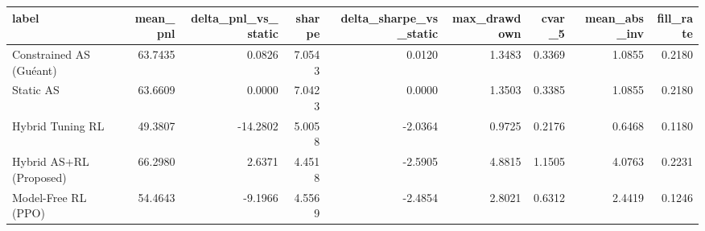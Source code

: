 \begin{tabular}{lrrrrrrrr}
\toprule
label & mean\_pnl & delta\_pnl\_vs\_static & sharpe & delta\_sharpe\_vs\_static & max\_drawdown & cvar\_5 & mean\_abs\_inv & fill\_rate \\
\midrule
Constrained AS (Guéant) & 63.7435 & 0.0826 & 7.0543 & 0.0120 & 1.3483 & 0.3369 & 1.0855 & 0.2180 \\
Static AS & 63.6609 & 0.0000 & 7.0423 & 0.0000 & 1.3503 & 0.3385 & 1.0855 & 0.2180 \\
Hybrid Tuning RL & 49.3807 & -14.2802 & 5.0058 & -2.0364 & 0.9725 & 0.2176 & 0.6468 & 0.1180 \\
Hybrid AS+RL (Proposed) & 66.2980 & 2.6371 & 4.4518 & -2.5905 & 4.8815 & 1.1505 & 4.0763 & 0.2231 \\
Model-Free RL (PPO) & 54.4643 & -9.1966 & 4.5569 & -2.4854 & 2.8021 & 0.6312 & 2.4419 & 0.1246 \\
\bottomrule
\end{tabular}
